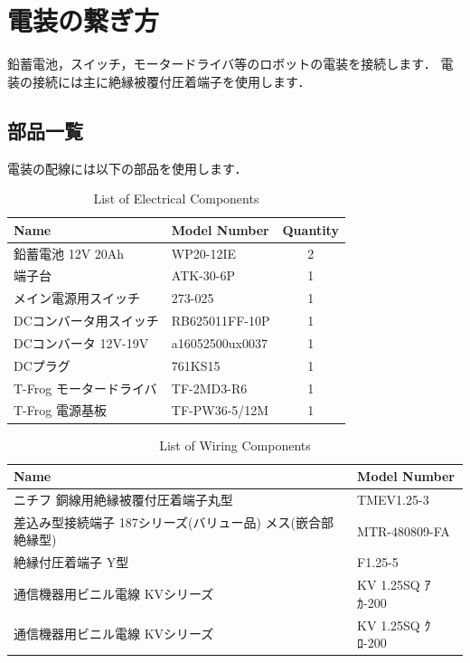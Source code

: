 \documentclass[{../../master}]{subfiles}
\begin{document}
  \section{電装の繋ぎ方}

  鉛蓄電池，スイッチ，モータードライバ等のロボットの電装を接続します．
  電装の接続には主に絶縁被覆付圧着端子を使用します．

  \subsection{部品一覧}
  
  電装の配線には以下の部品を使用します．

  \begin{table}[ht]
    \begin{center}
      \begin{tabular}{|l|l|c|}
        \hline
          Name & Model Number & Quantity \\ \hline
          鉛蓄電池 12V 20Ah & WP20-12IE & 2 \\ \hline
          端子台 & ATK-30-6P & 1  \\ \hline
          メイン電源用スイッチ & 273-025 & 1  \\ \hline
          DCコンバータ用スイッチ & RB625011FF-10P & 1  \\ \hline
          DCコンバータ 12V-19V & a16052500ux0037 & 1  \\ \hline
          DCプラグ & 761KS15 & 1  \\ \hline
          T-Frog モータードライバ & TF-2MD3-R6 & 1  \\ \hline
          T-Frog 電源基板 & TF-PW36-5/12M & 1  \\ \hline
        \end{tabular}
    \end{center}
    \caption{List of Electrical Components}
    \label{tab:list_of_electrical_components}
  \end{table}

  \begin{table}[ht]
    \begin{center}
      \begin{tabular}{|l|l|}
        \hline
        Name & Model Number \\ \hline
        ニチフ 銅線用絶縁被覆付圧着端子丸型 & TMEV1.25-3 \\ \hline
        差込み型接続端子 187シリーズ(バリュー品) メス(嵌合部絶縁型) & MTR-480809-FA \\ \hline
        絶縁付圧着端子 Y型 & F1.25-5 \\ \hline
        通信機器用ビニル電線 KVシリーズ & KV 1.25SQ ｱｶ-200 \\ \hline
        通信機器用ビニル電線 KVシリーズ & KV 1.25SQ ｸﾛ-200 \\ \hline
      \end{tabular}
    \end{center}
    \caption{List of Wiring Components}
    \label{tab:list_of_wiring_components}
  \end{table}
\end{document}
